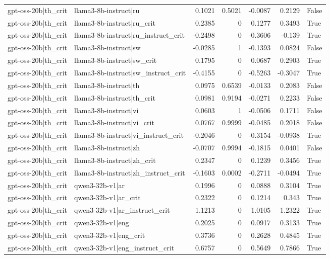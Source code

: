 \begin{table}
\begin{tabular}{l l r r r r l}
gpt-oss-20b|th_crit & llama3-8b-instruct|ru & 0.1021 & 0.5021 & -0.0087 & 0.2129 & False \\
gpt-oss-20b|th_crit & llama3-8b-instruct|ru_crit & 0.2385 & 0 & 0.1277 & 0.3493 & True \\
gpt-oss-20b|th_crit & llama3-8b-instruct|ru_instruct_crit & -0.2498 & 0 & -0.3606 & -0.139 & True \\
gpt-oss-20b|th_crit & llama3-8b-instruct|sw & -0.0285 & 1 & -0.1393 & 0.0824 & False \\
gpt-oss-20b|th_crit & llama3-8b-instruct|sw_crit & 0.1795 & 0 & 0.0687 & 0.2903 & True \\
gpt-oss-20b|th_crit & llama3-8b-instruct|sw_instruct_crit & -0.4155 & 0 & -0.5263 & -0.3047 & True \\
gpt-oss-20b|th_crit & llama3-8b-instruct|th & 0.0975 & 0.6539 & -0.0133 & 0.2083 & False \\
gpt-oss-20b|th_crit & llama3-8b-instruct|th_crit & 0.0981 & 0.9194 & -0.0271 & 0.2233 & False \\
gpt-oss-20b|th_crit & llama3-8b-instruct|vi & 0.0603 & 1 & -0.0506 & 0.1711 & False \\
gpt-oss-20b|th_crit & llama3-8b-instruct|vi_crit & 0.0767 & 0.9999 & -0.0485 & 0.2018 & False \\
gpt-oss-20b|th_crit & llama3-8b-instruct|vi_instruct_crit & -0.2046 & 0 & -0.3154 & -0.0938 & True \\
gpt-oss-20b|th_crit & llama3-8b-instruct|zh & -0.0707 & 0.9994 & -0.1815 & 0.0401 & False \\
gpt-oss-20b|th_crit & llama3-8b-instruct|zh_crit & 0.2347 & 0 & 0.1239 & 0.3456 & True \\
gpt-oss-20b|th_crit & llama3-8b-instruct|zh_instruct_crit & -0.1603 & 0.0002 & -0.2711 & -0.0494 & True \\
gpt-oss-20b|th_crit & qwen3-32b-v1|ar & 0.1996 & 0 & 0.0888 & 0.3104 & True \\
gpt-oss-20b|th_crit & qwen3-32b-v1|ar_crit & 0.2322 & 0 & 0.1214 & 0.343 & True \\
gpt-oss-20b|th_crit & qwen3-32b-v1|ar_instruct_crit & 1.1213 & 0 & 1.0105 & 1.2322 & True \\
gpt-oss-20b|th_crit & qwen3-32b-v1|eng & 0.2025 & 0 & 0.0917 & 0.3133 & True \\
gpt-oss-20b|th_crit & qwen3-32b-v1|eng_crit & 0.3736 & 0 & 0.2628 & 0.4845 & True \\
gpt-oss-20b|th_crit & qwen3-32b-v1|eng_instruct_crit & 0.6757 & 0 & 0.5649 & 0.7866 & True \\

\end{tabular}
\end{table}
